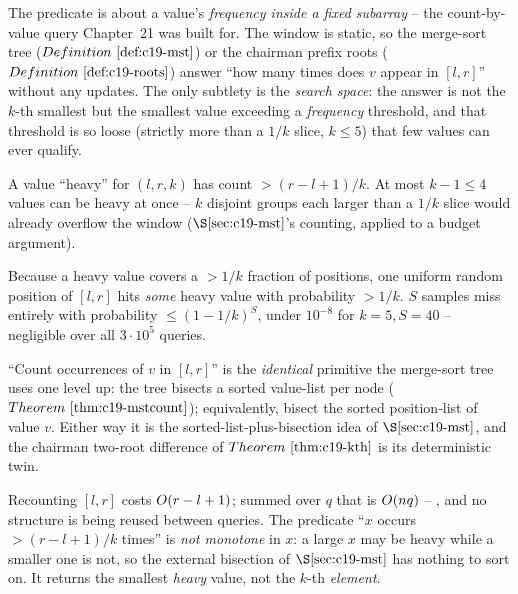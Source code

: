 The predicate is about a value's \emph{frequency inside a fixed subarray} -- the count-by-value
query Chapter~21 was built for. The window is static, so the merge-sort tree (\(\defref{c19-mst}\))
or the chairman prefix roots (\(\defref{c19-roots}\)) answer ``how many times does \(v\) appear
in \([l,r]\)'' without any updates. The only subtlety is the \emph{search space}: the answer is
not the \(k\)-th smallest but the smallest value exceeding a \emph{frequency} threshold, and
that threshold is so loose (strictly more than a \(1/k\) slice, \(k\le5\)) that few values can
ever qualify.

\begin{observation}
A value ``heavy'' for \((l,r,k)\) has count \(> (r-l+1)/k\). At most \(k-1\le4\) values can be
heavy at once -- \(k\) disjoint groups each larger than a \(1/k\) slice would already overflow
the window (\(\secref{c19-mst}\)'s counting, applied to a budget argument).
\end{observation}
\begin{observation}
Because a heavy value covers a \(>1/k\) fraction of positions, one uniform random position of
\([l,r]\) hits \emph{some} heavy value with probability \(>1/k\). \(S\) samples miss entirely
with probability \(\le(1-1/k)^{S}\), under \(10^{-8}\) for \(k=5,S=40\) -- negligible over all
\(3\cdot10^5\) queries.
\end{observation}
\begin{observation}
``Count occurrences of \(v\) in \([l,r]\)'' is the \emph{identical} primitive the merge-sort
tree uses one level up: the tree bisects a sorted value-list per node
(\(\thmref{c19-mstcount}\)); equivalently, bisect the sorted position-list of value \(v\). Either
way it is the sorted-list-plus-bisection idea of \(\secref{c19-mst}\), and the chairman two-root
difference of \(\thmref{c19-kth}\) is its deterministic twin.
\end{observation}

\begin{thinkbox}
{Recounting \([l,r]\) costs \(O(r-l+1)\); summed over \(q\) that is \(O(nq)\) --
\tle, and no structure is being reused between queries.}
{The predicate ``\(x\) occurs \(>\!(r-l+1)/k\) times'' is \emph{not monotone} in \(x\): a large
\(x\) may be heavy while a smaller one is not, so the external bisection of
\(\secref{c19-mst}\) has nothing to sort on. It returns the smallest \emph{heavy} value, not the
\(k\)-th \emph{element}.}
\end{thinkbox}

